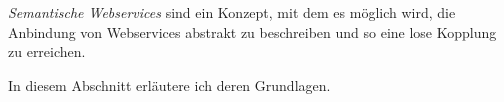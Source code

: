 
\emph{Semantische Webservices} sind ein Konzept, mit dem es möglich wird, die Anbindung von Webservices abstrakt zu beschreiben und so eine lose Kopplung zu erreichen.

In diesem Abschnitt erläutere ich deren Grundlagen.